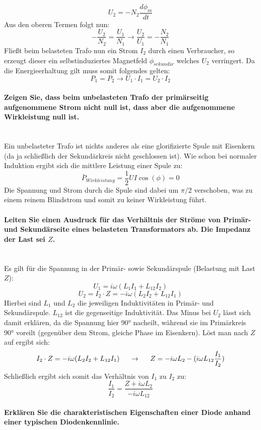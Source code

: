 \documentclass[a4paper, 11pt, ngerman, parskip=half-]{scrartcl}
\newcommand{\myparagraph}[1]{\paragraph{#1}\mbox{}\\}
\begin{document}
\[U_2 = -N_2 \frac{d \phi_m}{d t}\]
Aus den oberen Termen folgt nun:
\begin{equation}
    - \frac{U_2}{N_2} = \frac{U_1}{N_1} \rightarrow \frac{U_2}{U_1} = - \frac{N_2}{N_1}
\end{equation}
Fließt beim belasteten Trafo nun ein Strom $I_2$ durch einen Verbraucher, so erzeugt dieser ein selbstinduziertes Magnetfeld $\phi_{sekundär}$
welches $U_2$ verringert. Da die Energieerhaltung gilt muss somit folgendes gelten:
\[P_1 = P_2 \rightarrow U_1 \cdot I_1 = U_2 \cdot I_2\]
\myparagraph{Zeigen Sie, dass beim unbelasteten Trafo der primärseitig aufgenommene Strom nicht null
    ist, dass aber die aufgenommene Wirkleistung null ist.}
Ein unbelasteter Trafo ist nichts anderes als eine glorifizierte Spule mit Eisenkern (da ja schließlich der Sekundärkreis nicht geschlossen ist).
Wie schon bei normaler Induktion ergibt sich die mittlere Leistung einer Spule zu:
\begin{equation}
    \bar{P}_{Wirkleistung} = \frac{1}{2} U I \cos(\phi) = 0
\end{equation}
Die Spannung und Strom durch die Spule sind dabei um $\pi/2$ verschoben, was zu einem reinem Blindstrom und somit zu keiner Wirkleistung führt.
\myparagraph{Leiten Sie einen Ausdruck für das Verhältnis der Ströme von Primär- und Sekundärseite
    eines belasteten Transformators ab. Die Impedanz der Last sei $Z$.}
Es gilt für die Spannung in der Primär- sowie Sekundärspule (Belastung mit Last $Z$):
\[U_1 = i\omega (L_1 I_1 + L_{12} I_2)\]
\[U_2 = I_2 \cdot Z = -i \omega (L_2 I_2 + L_{12} I_1)\]
Hierbei sind $L_1$ und $L_2$ die jeweiligen Induktivitäten in Primär- und Sekundärspule. $L_{12}$ ist die gegenseitige Induktivität.
Das Minus bei $U_2$ lässt sich damit erklären, da die Spannung hier 90° nacheilt, während sie im Primärkreis 90° voreilt (gegenüber dem Strom, gleiche Phase im Eisenkern).
Löst man nach $Z$ auf ergibt sich:
\begin{equation}
    I_2 \cdot Z = -i \omega(L_2 I_2 + L_{12} I_1) \hspace{5mm} \rightarrow \hspace{5mm} Z = -i \omega L_2 - (i \omega L_{12} \frac{I_1}{I_2})
\end{equation}
Schließlich ergibt sich somit das Verhältnis von $I_1$ zu $I_2$ zu:
\begin{equation}
    \frac{I_1}{I_2} = \frac{Z + i \omega L_2}{-i \omega L_{12}}
\end{equation}
\newpage
\myparagraph{Erklären Sie die charakteristischen Eigenschaften einer Diode anhand einer typischen
    Diodenkennlinie.}
\end{document}
